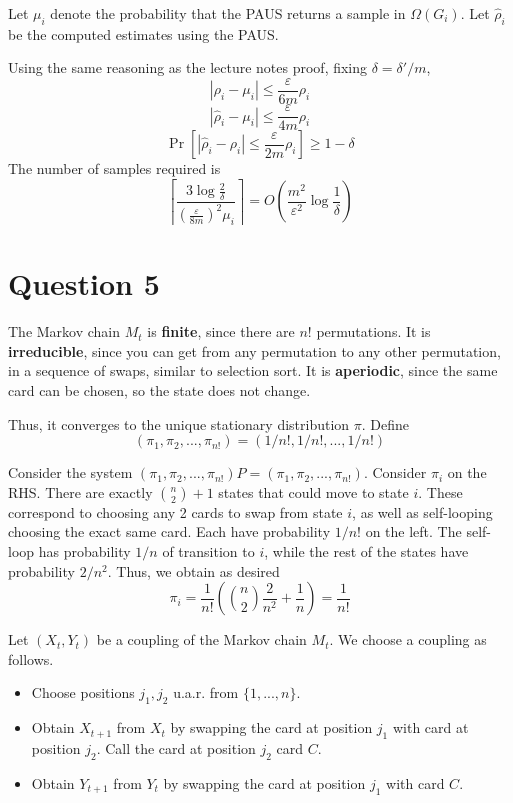 \documentclass[11pt]{article} %
\begin{document}
Let $\mu_i$ denote the probability that the PAUS returns a sample in $\Omega(G_i)$.
Let $\hat{\rho}_i$ be the computed estimates using the PAUS.

Using the same reasoning as the lecture notes proof, fixing $\delta = \delta'/m$,
\[|\rho_i-\mu_i| \leq \frac{\varepsilon}{6m}\rho_i\]
\[|\hat{\rho}_i - \mu_i| \leq \frac{\varepsilon}{4m}\rho_i\]
\[\Pr\left[|\hat{\rho}_i - \rho_i| \leq \frac{\varepsilon}{2m}\rho_i\right] \geq 1 - \delta\]
The number of samples required is 
\[\left\lceil \frac{3\log\frac{2}{\delta}}{(\frac{\varepsilon}{8m})^2 \mu_i}\right\rceil
=O\left(\frac{m^2}{\varepsilon^2} \log\frac{1}{\delta}\right)\]

\section*{Question 5}
The Markov chain $M_t$ is \textbf{finite}, since there are $n!$ permutations.
It is \textbf{irreducible}, since you can get from any permutation to any other permutation,
in a sequence of swaps, similar to selection sort.
It is \textbf{aperiodic}, since the same card can be chosen, so the state does not change.

Thus, it converges to the unique stationary distribution $\pi$. Define
\[(\pi_1,\pi_2,...,\pi_{n!})=(1/n!,1/n!,...,1/n!)\]

Consider the system $(\pi_1,\pi_2,...,\pi_{n!})P=(\pi_1,\pi_2,...,\pi_{n!})$.
Consider $\pi_i$ on the RHS.
There are exactly $\binom{n}{2}+1$ states that could move to state $i$.
These correspond to choosing any 2 cards to swap from state $i$,
as well as self-looping choosing the exact same card.
Each have probability $1/n!$ on the left.
The self-loop has probability $1/n$ of transition to $i$, 
while the rest of the states have probability $2/n^2$.
Thus, we obtain as desired
\[\pi_i=\frac{1}{n!}\left(\binom{n}{2}\frac{2}{n^2} + \frac{1}{n}\right) = \frac{1}{n!}\]

Let $(X_t,Y_t)$ be a coupling of the Markov chain $M_t$.
We choose a coupling as follows.

\begin{itemize}
    \item Choose positions $j_1,j_2$ u.a.r. from $\{1,...,n\}$.
    \item Obtain $X_{t+1}$ from $X_t$ by swapping the card at position $j_1$ with card at position $j_2$.
    Call the card at position $j_2$ card $C$.
    \item Obtain $Y_{t+1}$ from $Y_t$ by swapping the card at position $j_1$ with card $C$.
\end{itemize}
\end{document}
